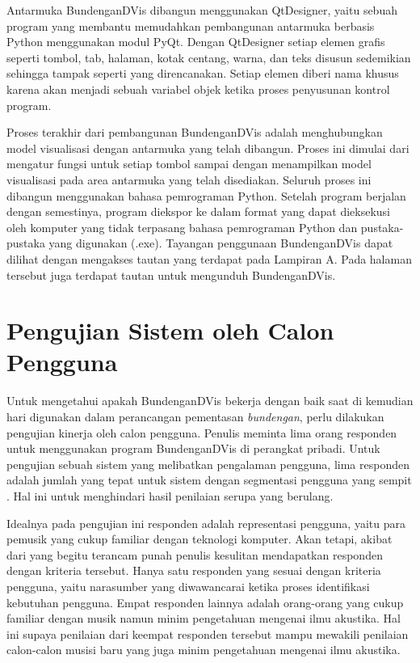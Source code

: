 Antarmuka BundenganDVis dibangun menggunakan QtDesigner, yaitu sebuah program yang membantu memudahkan pembangunan antarmuka berbasis Python menggunakan modul PyQt. Dengan QtDesigner setiap elemen grafis seperti tombol, tab, halaman, kotak centang, warna, dan teks disusun sedemikian sehingga tampak seperti yang direncanakan. Setiap elemen diberi nama khusus karena akan menjadi sebuah variabel objek ketika proses penyusunan kontrol program. \par 

Proses terakhir dari pembangunan BundenganDVis adalah menghubungkan model visualisasi dengan antarmuka yang telah dibangun. Proses ini dimulai dari mengatur fungsi untuk setiap tombol sampai dengan menampilkan model visualisasi pada area antarmuka yang telah disediakan. Seluruh proses ini dibangun menggunakan bahasa pemrograman Python. Setelah program berjalan dengan semestinya, program diekspor ke dalam format yang dapat dieksekusi oleh komputer yang tidak terpasang bahasa pemrograman Python dan pustaka-pustaka yang digunakan (.exe). Tayangan penggunaan BundenganDVis dapat dilihat dengan mengakses tautan yang terdapat pada Lampiran A. Pada halaman tersebut juga terdapat tautan untuk mengunduh BundenganDVis. \par 


\section{Pengujian Sistem oleh Calon Pengguna}
Untuk mengetahui apakah BundenganDVis bekerja dengan baik saat di kemudian hari digunakan dalam perancangan pementasan \emph{bundengan}, perlu dilakukan pengujian kinerja oleh calon pengguna. Penulis meminta lima orang responden untuk menggunakan program BundenganDVis di perangkat pribadi. Untuk pengujian sebuah sistem yang melibatkan pengalaman pengguna, lima responden adalah jumlah yang tepat untuk sistem dengan segmentasi pengguna yang sempit \cite{5user}. Hal ini untuk menghindari hasil penilaian serupa yang berulang. \par 

Idealnya pada pengujian ini responden adalah representasi pengguna, yaitu para pemusik \bundengan yang cukup familiar dengan teknologi komputer. Akan tetapi, akibat dari \bundengan yang begitu terancam punah penulis kesulitan mendapatkan responden dengan kriteria tersebut. Hanya satu responden yang sesuai dengan kriteria pengguna, yaitu narasumber yang diwawancarai ketika proses identifikasi kebutuhan pengguna. Empat responden lainnya adalah orang-orang yang cukup familiar dengan musik namun minim pengetahuan mengenai ilmu akustika. Hal ini supaya penilaian dari keempat responden tersebut mampu mewakili penilaian calon-calon musisi \bundengan baru yang juga minim pengetahuan mengenai ilmu akustika. \par 

